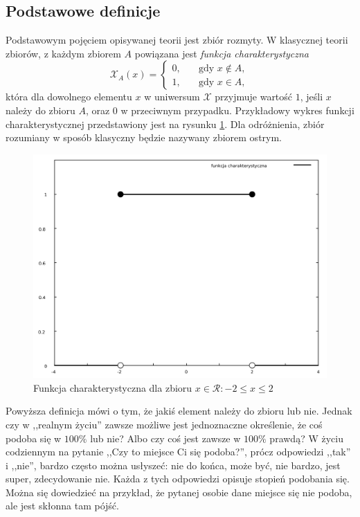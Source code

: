 \subsection{Podstawowe definicje}
Podstawowym pojęciem opisywanej teorii jest zbiór rozmyty. W klasycznej teorii
zbiorów, z każdym zbiorem $A$ powiązana jest \emph{funkcja charakterystyczna}
$$ \mathcal{X}_A(x) = 
  \left\{ 
	\begin{array}{ll}
	  0, & \quad \textrm{gdy } x \notin A, \\
      1, & \quad \textrm{gdy } x \in A,
  	\end{array} 
  \right. $$  
która dla dowolnego elementu $x$  w uniwersum $\mathcal{X}$ przyjmuje wartość
$1$, jeśli $x$ należy do zbioru $A$, oraz $0$ w przeciwnym przypadku.
Przykładowy wykres funkcji charakterystycznej przedstawiony jest na rysunku
\ref{fig:funkcja_charakterystyczna}. Dla odróżnienia, zbiór rozumiany w sposób
klasyczny będzie nazywany zbiorem ostrym.

\begin{figure}[ht]
  \includegraphics[width=\linewidth]
  	{chapters/fuzzylogic/funkcja_charakterystyczna}
  \caption{Funkcja charakterystyczna dla zbioru $x \in \mathcal{R} : -2 \leq x
  \leq 2 $}
  \label{fig:funkcja_charakterystyczna}
\end{figure}

Powyższa definicja mówi o tym, że jakiś element należy do zbioru lub nie. Jednak
czy w ,,realnym życiu'' zawsze możliwe jest jednoznaczne określenie, że coś
podoba się w $100\%$ lub nie? Albo czy coś jest zawsze w $100\%$ prawdą? W życiu
codziennym na pytanie ,,Czy to miejsce Ci się podoba?'', prócz odpowiedzi
,,tak'' i ,,nie'', bardzo często można usłyszeć: nie do końca, może być, nie
bardzo, jest super, zdecydowanie nie. Każda z tych odpowiedzi opisuje stopień
podobania się. Można się dowiedzieć na przykład, że pytanej osobie dane miejsce
się nie podoba, ale jest skłonna tam pójść.

